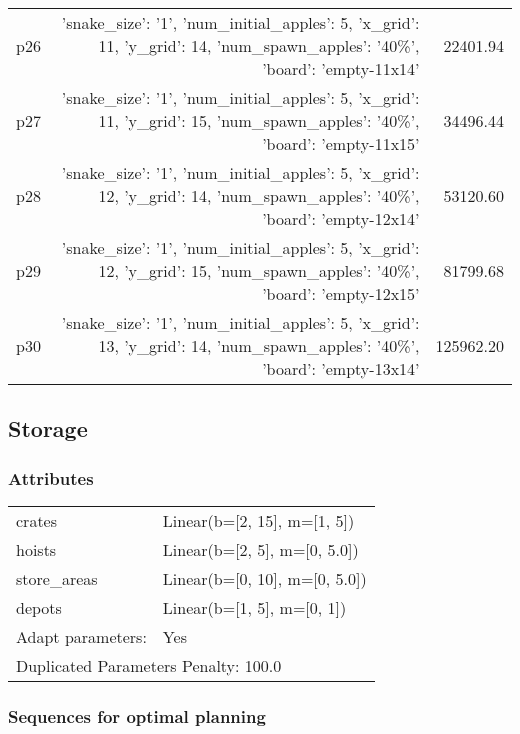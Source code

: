 \documentclass{article}
\begin{document}
\begin{center}
\begin{tabular}{@{}l|r|r@{}}
  p26&{'snake\_size': '1', 'num\_initial\_apples': 5, 'x\_grid': 11, 'y\_grid': 14, 'num\_spawn\_apples': '40\%', 'board': 'empty-11x14'}&22401.94\\
  p27&{'snake\_size': '1', 'num\_initial\_apples': 5, 'x\_grid': 11, 'y\_grid': 15, 'num\_spawn\_apples': '40\%', 'board': 'empty-11x15'}&34496.44\\
  p28&{'snake\_size': '1', 'num\_initial\_apples': 5, 'x\_grid': 12, 'y\_grid': 14, 'num\_spawn\_apples': '40\%', 'board': 'empty-12x14'}&53120.60\\
  p29&{'snake\_size': '1', 'num\_initial\_apples': 5, 'x\_grid': 12, 'y\_grid': 15, 'num\_spawn\_apples': '40\%', 'board': 'empty-12x15'}&81799.68\\
  p30&{'snake\_size': '1', 'num\_initial\_apples': 5, 'x\_grid': 13, 'y\_grid': 14, 'num\_spawn\_apples': '40\%', 'board': 'empty-13x14'}&125962.20
                            \end{tabular}
                            \end{center}
                    
                            \newpage \subsection{Storage}
                    \subsubsection*{Attributes}
                    \begin{tabular}{@{}p{}p{}@{}}
                    \toprule
                    crates & Linear(b=[2, 15], m=[1, 5])\\
hoists & Linear(b=[2, 5], m=[0, 5.0])\\
store\_areas & Linear(b=[0, 10], m=[0, 5.0])\\
depots & Linear(b=[1, 5], m=[0, 1])
                    \\\midrule
                    Adapt parameters: & Yes \\
                    \bottomrule
                    \multicolumn{2}{l}{Duplicated Parameters Penalty: 100.0}
                    \end{tabular}
                
                            \subsubsection*{Sequences for optimal planning}
\end{document}
